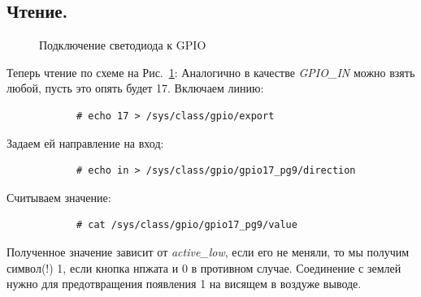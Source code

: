 \documentclass[a4paper,12pt]{report} %
\begin{document}
		\subsection{Чтение.}
			\begin{figure}[h]
				\caption{Подключение светодиода к GPIO}
				\label{ris:but}
			\end{figure}
			Теперь чтение по схеме на Рис.~\ref{ris:but}:
			Аналогично в качестве \emph{GPIO\_IN} можно взять любой, пусть это опять будет
			17.
			Включаем линию:
			\begin{verbatim}
			# echo 17 > /sys/class/gpio/export
			\end{verbatim}
			Задаем ей направление на вход:
			\begin{verbatim}
			# echo in > /sys/class/gpio/gpio17_pg9/direction
			\end{verbatim}
			Считываем значение:
			\begin{verbatim}
			# cat /sys/class/gpio/gpio17_pg9/value
			\end{verbatim} 
			Полученное значение зависит от \emph{active\_low}, если его не меняли, то мы
			получим символ(!) 1, если кнопка нпжата и 0 в противном случае. Соединение с землей
			нужно для предотвращения появления 1 на висящем в воздуже выводе.
\end{document}
